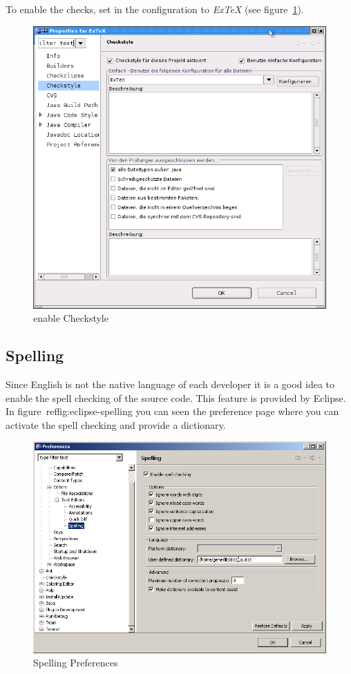 To enable the checks, set in 
the configuration to \emph{ExTeX} (see figure~\ref{fig:eclipse-checkstyle-enable}).
\begin{figure}[htp]
  \centering  \includegraphics[scale=.5]{image/eclipse-checkstyle-enable}
  \caption{enable Checkstyle}\label{fig:eclipse-checkstyle-enable}
\end{figure}




\subsection{Spelling}

Since English is not the native language of each developer it is a
good idea to enable the spell checking of the source code. This
feature is provided by Eclipse. In figure~ref{fig:eclipse-spelling}
you can seen the preference page where you can activate the spell
checking and provide a dictionary.
\begin{figure}[htp]
  \centering
  \includegraphics[scale=.4]{image/spelling}
  \caption{Spelling Preferences}\label{fig:eclipse-spelling}
\end{figure}


